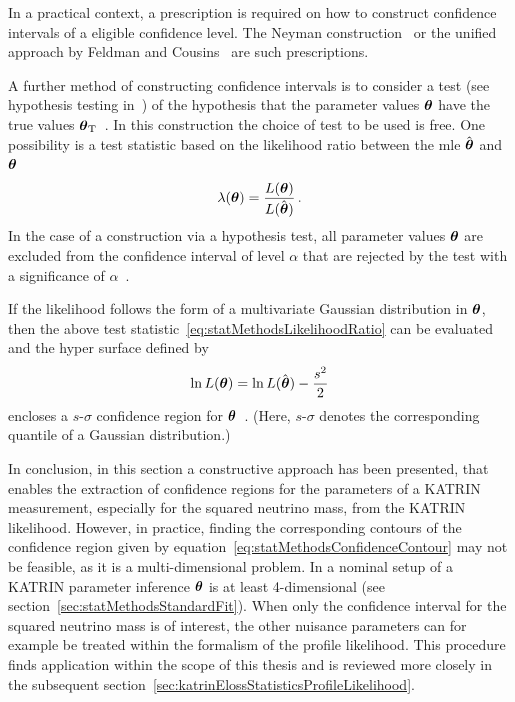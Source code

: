 In a practical context, a prescription is required on how to construct confidence intervals of a eligible confidence level. The Neyman construction~\cite{Neyman1937} or the unified approach by Feldman and Cousins~\cite{Feldman1998} are such prescriptions.

A further method of constructing confidence intervals is to consider a test (see hypothesis testing in~\cite{ReviewOfParticlePhysics}) of the hypothesis that the parameter values $\boldsymbol{\mathbf{\theta}}$ have the true values $\boldsymbol{\mathbf{\theta}}_\mathrm{T}$~\cite{ReviewOfParticlePhysics}. In this construction the choice of test to be used is free. One possibility is a test statistic based on the likelihood ratio between the \gls{mle} $\hat{\boldsymbol{\mathbf{\theta}}}$ and $\boldsymbol{\mathbf{\theta}}$~\cite{ReviewOfParticlePhysics}
\begin{equation}
	\label{eq:statMethodsLikelihoodRatio}
	\lambda(\boldsymbol{\mathbf{\theta}}) =
	\frac{L(\boldsymbol{\mathbf{\theta}})}{L(\hat{\boldsymbol{\mathbf{\theta}}})}
	\text{\,.}
\end{equation}
In the case of a construction via a hypothesis test, all parameter values $\boldsymbol{\mathbf{\theta}}$ are excluded from the confidence interval of level $\alpha$ that are rejected by the test with a significance of $\alpha$~\cite{ReviewOfParticlePhysics}.

If the likelihood follows the form of a multivariate Gaussian distribution in $\boldsymbol{\mathbf{\theta}}$, then the above test statistic~\eqref{eq:statMethodsLikelihoodRatio} can be evaluated and the hyper surface defined by
\begin{equation}
	\label{eq:statMethodsConfidenceContour}
	\ln L(\boldsymbol{\mathbf{\theta}}) = 	\ln L(\hat{\boldsymbol{\mathbf{\theta}}}) - \frac{s^2}{2}
\end{equation}
encloses a $s$-$\sigma$ confidence region for $\boldsymbol{\mathbf{\theta}}$~\cite{ReviewOfParticlePhysics}. (Here, $s$-$\sigma$ denotes the corresponding quantile of a Gaussian distribution.) 

In conclusion, in this section a constructive approach has been presented, that enables the extraction of confidence regions for the parameters of a KATRIN measurement, especially for the squared neutrino mass, from the KATRIN likelihood. However, in practice, finding the corresponding contours of the confidence region given by equation~\ref{eq:statMethodsConfidenceContour} may not be feasible, as it is a multi-dimensional problem. In a nominal setup of a KATRIN parameter inference $\boldsymbol{\mathbf{\theta}}$ is at least 4-dimensional (see section~\ref{sec:statMethodsStandardFit}). When only the confidence interval for the squared neutrino mass is of interest, the other nuisance parameters can for example be treated within the formalism of the profile likelihood. This procedure finds application within the scope of this thesis and is reviewed more closely in the subsequent section~\ref{sec:katrinElossStatisticsProfileLikelihood}.

